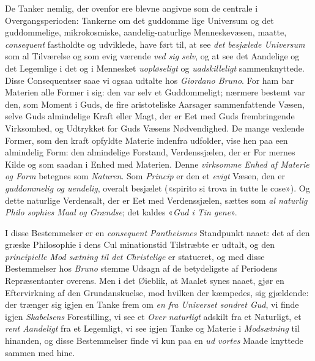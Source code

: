 De Tanker nemlig, der ovenfor ere blevne angivne som
de centrale i Overgangsperioden: Tankerne om det guddomme\-%
lige Universum og det guddommelige, mikrokosmiske, aandelig-naturlige
Menneskevæsen, maatte, \emph{consequent} fastholdte og
udviklede, have ført til, at see \emph{det besjælede Universum}
 som al Tilværelse og som evig værende \emph{ved sig selv}, og at
see det Aandelige og det Legemlige i det og i Mennesket
\emph{uopløseligt} og \emph{uadskilleligt} sammenknyttede. Disse
Consequentser saae vi ogsaa udtalte hos \emph{Giordano Bruno}.
For ham bar Materien alle Former i sig: den var selv et
Guddommeligt; nærmere bestemt var den, som Moment i Guds,
de fire aristoteliske Aarsager sammenfattende Væsen, selve
Guds almindelige Kraft eller Magt, der er Eet med Guds
frembringende Virksomhed, og Udtrykket for Guds Væsens
Nødvendighed. De mange vexlende Former, som den kraft\-%
opfyldte Materie indenfra udfolder, vise hen paa een almindelig
Form: den almindelige Forstand, Verdenssjælen, der er For\-%
mernes Kilde og som saadan i Enhed med Materien. Denne
\emph{virksomme Enhed af Materie og Form} betegnes som
\emph{Naturen}. Som \emph{Princip} er den et \emph{evigt} Væsen, den er
\emph{guddommelig og uendelig}, overalt besjælet («spirito si
trova in tutte le cose»). Og dette naturlige Verdensalt, der
er Eet med Verdenssjælen, sættes som \emph{al naturlig Philo\-%
sophies Maal og Grændse}; det kaldes «\emph{Gud i Tin\-%
gene}».

I disse Bestemmelser er en \emph{consequent Pantheismes}
Standpunkt naaet: det af den græske Philosophie i dens Cul\-%
minationstid Tilstræbte er udtalt, og den \emph{principielle Mod\-%
sætning til det Christelige} er statueret, og med disse
Bestemmelser hos \emph{Bruno} stemme Udsagn af de betydeligste
af Periodens Repræsentanter overens. Men i det Øieblik, at
Maalet synes naaet, gjør en Eftervirkning af den Grundanskuelse,
mod hvilken der kæmpedes, sig gjældende: der trænger sig
igjen en Tanke frem om \emph{en fra Universet sondret Gud},
vi finde igjen \emph{Skabelsens} Forestilling, vi see et \emph{Over\-%
naturligt} adskilt fra et Naturligt, et \emph{rent Aandeligt} fra
et Legemligt, vi see igjen Tanke og Materie i \emph{Modsætning}
til hinanden, og disse Bestemmelser finde vi kun paa en \emph{ud\-%
vortes} Maade knyttede sammen med hine.

